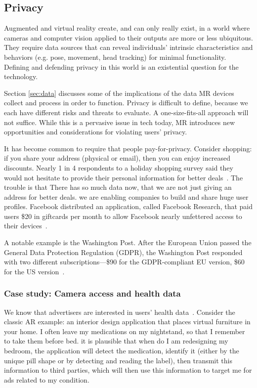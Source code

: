 
\subsection{Privacy}
Augmented and virtual reality create, and can only really exist, in a world where cameras and computer vision applied to their outputs are more or less ubiquitous. They require data sources that can reveal individuals' intrinsic characteristics and behaviors (e.g. pose, movement, head tracking) for minimal functionality. Defining and defending privacy in this world is an existential question for the technology.

Section \ref{sec:data} discusses some of the implications of the data MR devices collect and process in order to function. Privacy is difficult to define, because we each have different risks and threats to evaluate. A one-size-fits-all approach will not suffice. While this is a pervasive issue in tech today, MR introduces new opportunities and considerations for violating users' privacy.

It has become common to require that people pay-for-privacy. Consider shopping: if you share your address (physical or email), then you can enjoy increased discounts. Nearly 1 in 4 respondents to a holiday shopping survey said they would not hesitate to provide their personal information for better deals~\cite{moses}. The trouble is that There has so much data now, that we are not just giving an address for better deals. we are enabling companies to build and share huge user profiles. Facebook distributed an application, called Facebook Research, that paid users \$20 in giftcards per month to allow Facebook nearly unfettered access to their devices~\cite{axon}.

A notable example is the Washington Post. After the European Union passed the General Data Protection Regulation (GDPR), the Washington Post responded with two different subscriptions---\$90 for the GDPR-compliant EU version, \$60 for the US version~\cite{karl}.

\subsubsection{Case study: Camera access and health data}\label{sec:data:world:camera}

We know that advertisers are interested in users' health data~\cite{jeong2019insurers}. Consider the classic AR example: an interior design application that places virtual furniture in your home. I often leave my medications on my nightstand, so that I remember to take them before bed. it is plausible that when do I am redesigning my bedroom, the application will detect the medication, identify it (either by the unique pill shape or by detecting and reading the label), then transmit this information to third parties, which will then use this information to target me for ads related to my condition.

